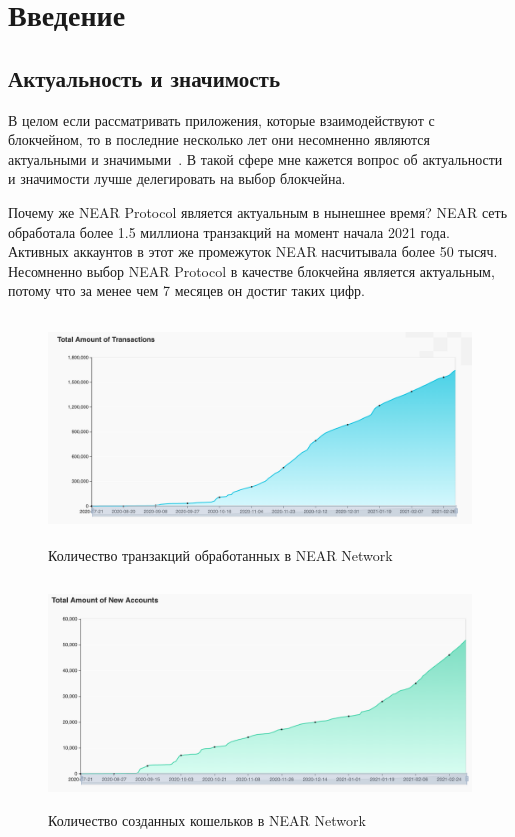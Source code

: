 \section{Введение}
\subsection{Актуальность и значимость}

В целом если рассматривать приложения, которые взаимодействуют с блокчейном, то в последние несколько лет они несомненно являются актуальными и значимыми~\cite{DBLP:journals/corr/abs-1712-04649}. В такой сфере мне кажется вопрос об актуальности и значимости лучше делегировать на выбор блокчейна.

Почему же NEAR Protocol является актуальным в нынешнее время? NEAR сеть обработала более 1.5 миллиона транзакций на момент начала 2021 года. Активных аккаунтов в этот же промежуток NEAR насчитывала более 50 тысяч. Несомненно выбор NEAR Protocol в качестве блокчейна является актуальным, потому что за менее чем 7 месяцев он достиг таких цифр.

\begin{figure}[H]
	\centering
	\includegraphics[height=60mm]{fig/near_1.png}
	\caption{Количество транзакций обработанных в NEAR Network}
\end{figure}


\begin{figure}[H]
	\centering
	\includegraphics[height=60mm]{fig/near_2.png}
	\caption{Количество созданных кошельков в NEAR Network}
\end{figure}

